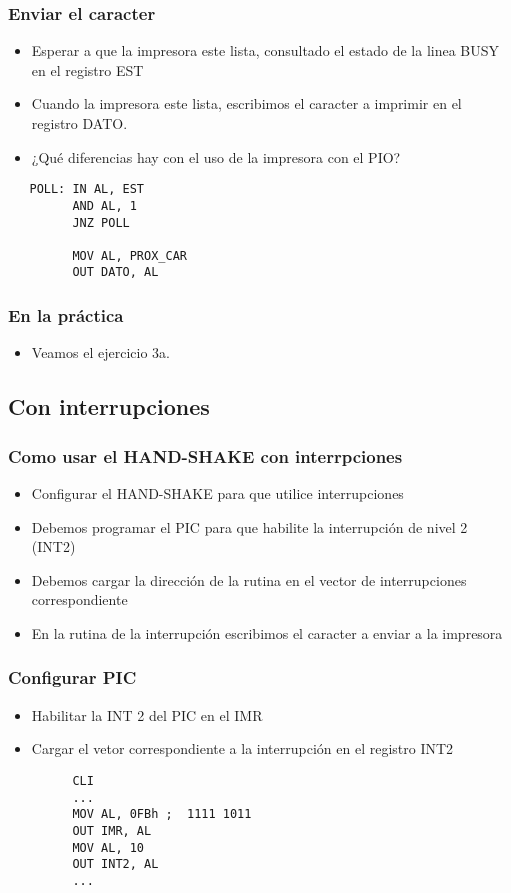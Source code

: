 \documentclass{beamer}
\begin{document}
\begin{frame}[fragile]
\frametitle{Enviar el caracter}
\begin{itemize}
 \item Esperar a que la impresora este lista, consultado el estado de la linea BUSY en el registro EST
 \item Cuando la impresora este lista, escribimos el caracter a imprimir en el registro DATO.
 \item ¿Qué diferencias hay con el uso de la impresora con el PIO?
\end{itemize}
\begin{block}{}
 \begin{verbatim}
   POLL: IN AL, EST
         AND AL, 1
         JNZ POLL

         MOV AL, PROX_CAR
         OUT DATO, AL
 \end{verbatim}
\end{block}
\end{frame}


\begin{frame}
\frametitle{En la práctica}
\begin{itemize}
 \item Veamos el ejercicio 3a. 
\end{itemize}
\end{frame}

\subsection{Con interrupciones}
\begin{frame}[fragile]
\frametitle{Como usar el HAND-SHAKE con interrpciones}
\begin{itemize}
 \item Configurar el HAND-SHAKE para que utilice interrupciones
 \item Debemos programar el PIC para que habilite la interrupción de nivel 2 (INT2)
 \item Debemos cargar la dirección de la rutina en el vector de interrupciones correspondiente
 \item En la rutina de la interrupción escribimos el caracter a enviar a la impresora
\end{itemize}
\end{frame}

\begin{frame}[fragile]
\frametitle{Configurar PIC}
\begin{itemize}
 \item Habilitar la INT 2 del PIC en el IMR
 \item Cargar el vetor correspondiente a la interrupción en el registro INT2
\end{itemize}
\begin{block}{}
 \begin{verbatim}
         CLI
         ...
         MOV AL, 0FBh ;  1111 1011 
         OUT IMR, AL
         MOV AL, 10
         OUT INT2, AL
         ...
 \end{verbatim}
\end{block}
\end{frame}
\end{document}
